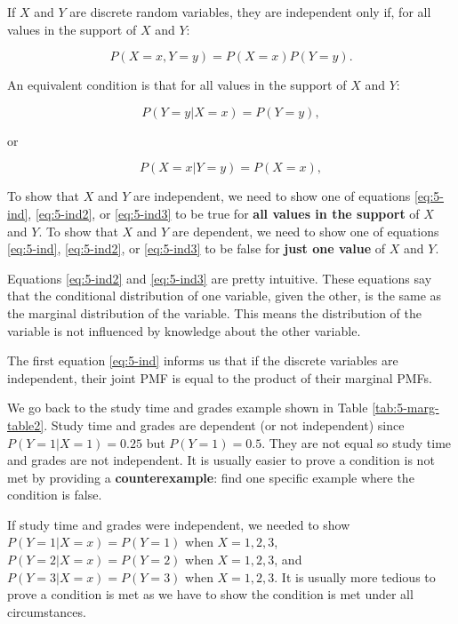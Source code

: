 \documentclass[
]{book}
\begin{document}
If \(X\) and \(Y\) are discrete random variables, they are independent only if, for all values in the support of \(X\) and \(Y\):

\begin{equation} 
P(X=x, Y=y) = P(X=x) P(Y=y).
\label{eq:5-ind}
\end{equation}

An equivalent condition is that for all values in the support of \(X\) and \(Y\):

\begin{equation} 
P(Y=y | X=x) = P(Y=y),
\label{eq:5-ind2}
\end{equation}

or

\begin{equation} 
P(X=x | Y=y) = P(X=x),
\label{eq:5-ind3}
\end{equation}

To show that \(X\) and \(Y\) are independent, we need to show one of equations \eqref{eq:5-ind}, \eqref{eq:5-ind2}, or \eqref{eq:5-ind3} to be true for \textbf{all values in the support} of \(X\) and \(Y\). To show that \(X\) and \(Y\) are dependent, we need to show one of equations \eqref{eq:5-ind}, \eqref{eq:5-ind2}, or \eqref{eq:5-ind3} to be false for \textbf{just one value} of \(X\) and \(Y\).

Equations \eqref{eq:5-ind2} and \eqref{eq:5-ind3} are pretty intuitive. These equations say that the conditional distribution of one variable, given the other, is the same as the marginal distribution of the variable. This means the distribution of the variable is not influenced by knowledge about the other variable.

The first equation \eqref{eq:5-ind} informs us that if the discrete variables are independent, their joint PMF is equal to the product of their marginal PMFs.

We go back to the study time and grades example shown in Table \ref{tab:5-marg-table2}. Study time and grades are dependent (or not independent) since \(P(Y=1|X=1) = 0.25\) but \(P(Y=1) = 0.5\). They are not equal so study time and grades are not independent. It is usually easier to prove a condition is not met by providing a \textbf{counterexample}: find one specific example where the condition is false.

If study time and grades were independent, we needed to show \(P(Y=1|X=x) = P(Y=1)\) when \(X=1,2,3\), \(P(Y=2|X=x) = P(Y=2)\) when \(X=1,2,3\), and \(P(Y=3|X=x) = P(Y=3)\) when \(X=1,2,3\). It is usually more tedious to prove a condition is met as we have to show the condition is met under all circumstances.
\end{document}
